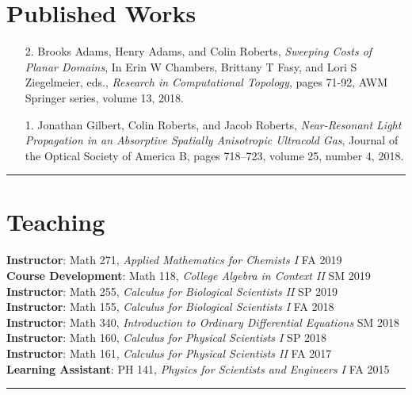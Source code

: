 \documentclass[12pt]{article} %
\begin{document}
\section{Published Works}
\begin{flushleft}
\begin{itemize}[leftmargin=*]
    \item[2.] Brooks Adams, Henry Adams, and Colin Roberts, \textit{Sweeping Costs of Planar Domains}, In Erin W Chambers, Brittany T Fasy, and Lori S Ziegelmeier, eds., \emph{Research in Computational Topology}, pages 71-92, AWM Springer series, volume 13, 2018.
    
    \item[1.] Jonathan Gilbert, Colin Roberts, and Jacob Roberts, \textit{Near-Resonant Light Propagation in an Absorptive Spatially Anisotropic Ultracold Gas}, Journal of the Optical Society of America B, pages 718–723, volume 25, number 4, 2018.
\end{itemize}
\end{flushleft}
\rule{\textwidth}{0.5mm}




\section{Teaching}
\begin{flushleft}
\textbf{Instructor}: Math 271, \emph{Applied Mathematics for Chemists I} \hfill FA 2019\\
\vspace*{5pt}
\textbf{Course Development}: Math 118, \emph{College Algebra in Context II} \hfill SM 2019\\
\vspace*{5pt}
\textbf{Instructor}: Math 255, \emph{Calculus for Biological Scientists II} \hfill SP 2019\\
\vspace*{5pt}
\textbf{Instructor}: Math 155, \emph{Calculus for Biological Scientists I} \hfill FA 2018\\
\vspace*{5pt}
\textbf{Instructor}: Math 340, \emph{Introduction to Ordinary Differential Equations} \hfill SM 2018\\
\vspace*{5pt}
\textbf{Instructor}: Math 160, \emph{Calculus for Physical Scientists I} \hfill SP 2018\\
\vspace*{5pt}
\textbf{Instructor}: Math 161, \emph{Calculus for Physical Scientists II} \hfill FA 2017\\
\vspace*{5pt}
\textbf{Learning Assistant}: PH 141, \emph{Physics for Scientists and Engineers I} \hfill FA 2015
\end{flushleft}
\rule{\textwidth}{0.5mm}
\end{document}
